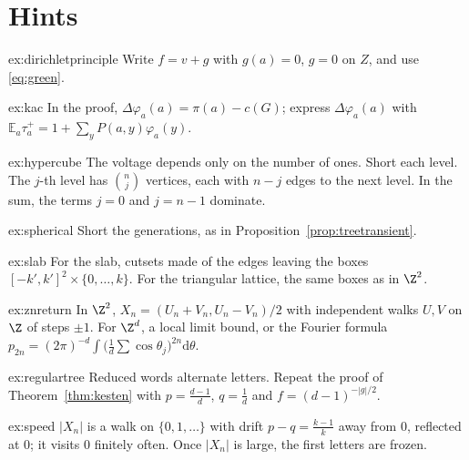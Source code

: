 \section{Hints}

\begin{hint}{ex:dirichletprinciple}
Write $f=v+g$ with $g(a)=0$, $g=0$ on $Z$, and use \eqref{eq:green}.
\end{hint}

\begin{hint}{ex:kac}
In the proof, $\Delta\varphi_a(a)=\pi(a)-c(G)$; express $\Delta\varphi_a(a)$ with $\mathbb E_a\tau_a^+=1+\sum_yP(a,y)\varphi_a(y)$.
\end{hint}

\begin{hint}{ex:hypercube}
The voltage depends only on the number of ones. Short each level. The $j$-th level has $\binom nj$ vertices, each with $n-j$ edges to the next level. In the sum, the terms $j=0$ and $j=n-1$ dominate.
\end{hint}

\begin{hint}{ex:spherical}
Short the generations, as in Proposition~\ref{prop:treetransient}.
\end{hint}

\begin{hint}{ex:slab}
For the slab, cutsets made of the edges leaving the boxes $[-k',k']^2\times\{0,\dots,k\}$. For the triangular lattice, the same boxes as in $\Z^2$.
\end{hint}

\begin{hint}{ex:znreturn}
In $\Z^2$, $X_n=(U_n+V_n,U_n-V_n)/2$ with independent walks $U,V$ on $\Z$ of steps $\pm1$. For $\Z^d$, a local limit bound, or the Fourier formula $p_{2n}=(2\pi)^{-d}\int\bigl(\frac1d\sum\cos\theta_j\bigr)^{2n}\mathrm d\theta$.
\end{hint}

\begin{hint}{ex:regulartree}
Reduced words alternate letters. Repeat the proof of Theorem~\ref{thm:kesten} with $p=\frac{d-1}d$, $q=\frac1d$ and $f=(d-1)^{-|g|/2}$.
\end{hint}

\begin{hint}{ex:speed}
$|X_n|$ is a walk on $\{0,1,\dots\}$ with drift $p-q=\frac{k-1}k$ away from $0$, reflected at $0$; it visits $0$ finitely often. Once $|X_n|$ is large, the first letters are frozen.
\end{hint}

